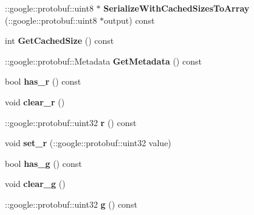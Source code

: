 \begin{DoxyCompactItemize}
\item 
\+::google\+::protobuf\+::uint8 $\ast$ {\bfseries Serialize\+With\+Cached\+Sizes\+To\+Array} (\+::google\+::protobuf\+::uint8 $\ast$output) const \hypertarget{classvss__state_1_1RGB_a5b53556c120673ad274fc0304bf33a0d}{}\label{classvss__state_1_1RGB_a5b53556c120673ad274fc0304bf33a0d}

\item 
int {\bfseries Get\+Cached\+Size} () const \hypertarget{classvss__state_1_1RGB_a40f2c075e63a05d37dd4023cd25c61e6}{}\label{classvss__state_1_1RGB_a40f2c075e63a05d37dd4023cd25c61e6}

\item 
\+::google\+::protobuf\+::\+Metadata {\bfseries Get\+Metadata} () const \hypertarget{classvss__state_1_1RGB_a72a71c6babca0d3cbd79caf9d8c9c9b2}{}\label{classvss__state_1_1RGB_a72a71c6babca0d3cbd79caf9d8c9c9b2}

\item 
bool {\bfseries has\+\_\+r} () const \hypertarget{classvss__state_1_1RGB_a44a2e2f01894715c2732c8455a27c158}{}\label{classvss__state_1_1RGB_a44a2e2f01894715c2732c8455a27c158}

\item 
void {\bfseries clear\+\_\+r} ()\hypertarget{classvss__state_1_1RGB_acf08083664a7f2da6c10b8faf4b25383}{}\label{classvss__state_1_1RGB_acf08083664a7f2da6c10b8faf4b25383}

\item 
\+::google\+::protobuf\+::uint32 {\bfseries r} () const \hypertarget{classvss__state_1_1RGB_ab1fb0a4d6eebeb673bc32c90b1b906ed}{}\label{classvss__state_1_1RGB_ab1fb0a4d6eebeb673bc32c90b1b906ed}

\item 
void {\bfseries set\+\_\+r} (\+::google\+::protobuf\+::uint32 value)\hypertarget{classvss__state_1_1RGB_a33dd755c711c8a7f5a1897e42ea4c711}{}\label{classvss__state_1_1RGB_a33dd755c711c8a7f5a1897e42ea4c711}

\item 
bool {\bfseries has\+\_\+g} () const \hypertarget{classvss__state_1_1RGB_a15f5bdc6f737b63ee48b030fb4348c3a}{}\label{classvss__state_1_1RGB_a15f5bdc6f737b63ee48b030fb4348c3a}

\item 
void {\bfseries clear\+\_\+g} ()\hypertarget{classvss__state_1_1RGB_acb92f198e1d2336c7f76a3aef3fb4cb2}{}\label{classvss__state_1_1RGB_acb92f198e1d2336c7f76a3aef3fb4cb2}

\item 
\+::google\+::protobuf\+::uint32 {\bfseries g} () const \hypertarget{classvss__state_1_1RGB_a36c2e8312984ac3b4577c6aae15878b2}{}\label{classvss__state_1_1RGB_a36c2e8312984ac3b4577c6aae15878b2}


\end{DoxyCompactItemize}
